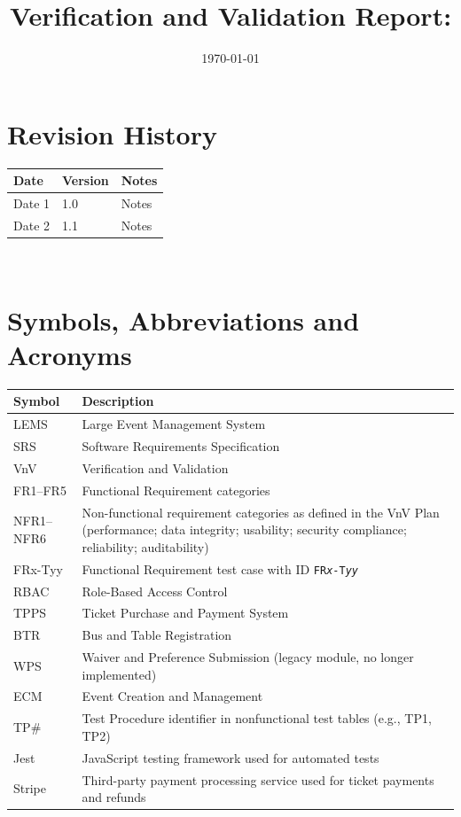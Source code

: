 \documentclass[12pt, titlepage]{article}
\begin{document}
\title{Verification and Validation Report: \progname}
\author{\authname}
\date{\today}

\maketitle


\section{Revision History}

\begin{tabularx}{\textwidth}{L{3cm}L{2cm}Y}
\toprule
{\bf Date} & {\bf Version} & {\bf Notes} \\
\midrule
Date 1 & 1.0 & Notes \\
Date 2 & 1.1 & Notes \\
\bottomrule
\end{tabularx}

~\newpage

\section{Symbols, Abbreviations and Acronyms}

\renewcommand{\arraystretch}{1.2}
\begin{tabularx}{\textwidth}{l Y}
  \toprule		
  \textbf{Symbol} & \textbf{Description}\\
  \midrule
  LEMS & Large Event Management System\\
  SRS & Software Requirements Specification\\
  VnV & Verification and Validation\\
  FR1--FR5 & Functional Requirement categories\\
  NFR1--NFR6 & Non-functional requirement categories as defined in the VnV Plan (performance; data integrity; usability; security compliance; reliability; auditability)\\
  FRx-Tyy & Functional Requirement test case with ID \texttt{FR\textit{x}-T\textit{yy}}\\
  RBAC & Role-Based Access Control\\
  TPPS & Ticket Purchase and Payment System\\
  BTR & Bus and Table Registration\\
  WPS & Waiver and Preference Submission (legacy module, no longer implemented)\\
  ECM & Event Creation and Management\\
  TP\# & Test Procedure identifier in nonfunctional test tables (e.g., TP1, TP2)\\
  Jest & JavaScript testing framework used for automated tests\\
  Stripe & Third-party payment processing service used for ticket payments and refunds\\
  \bottomrule
\end{tabularx}
\newpage
\end{document}
